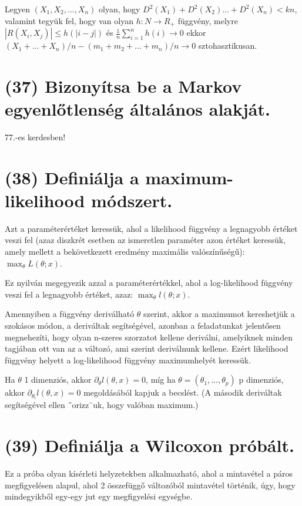 \documentclass[12p]{article}
\begin{document}
Legyen $(X_1, X_2, ..., X_n)$ olyan, hogy $D^2(X_1) + D^2(X_2) ... + D^2(X_n) < kn$, valamint tegyük fel, hogy van olyan $h: N \rightarrow R_{+}$ függvény, melyre $|R(X_i, X_j)| \leq h(|i-j|)$ és $\frac{1}{n} \displaystyle{\sum^n_{i=1}} h(i) \rightarrow 0$ ekkor $(X_1 + ... + X_n) / n - (m_1 + m_2 + ... + m_n)/n \rightarrow 0$ sztohasztikusan.

\section{(37) Bizonyítsa be a Markov egyenlőtlenség általános alakját.}

77.-es kerdesben!

\section{(38) Definiálja a maximum-likelihood módszert.}

Azt a paraméterértéket keressük, ahol a likelihood függvény a legnagyobb értéket veszi fel (azaz diszkrét esetben az
ismeretlen paraméter azon értéket keressük, amely mellett a bekövetkezett eredmény maximális valószínűségű): $\max_{\theta}L(\theta; x)$.

Ez nyilván megegyezik azzal a paraméterértékkel, ahol a log-likelihood függvény veszi fel a legnagyobb
értéket, azaz: $\max_{\theta} l(\theta; x)$.

Amennyiben a függvény deriválható $\theta$ szerint, akkor a maximumot kereshetjük a szokásos módon, a deriváltak
segítségével, azonban a feladatunkat jelentősen megnehezíti, hogy olyan n-szeres szorzatot kellene deriválni, amelyiknek minden tagjában ott van az a változó, ami szerint deriválnunk kellene. Ezért likelihood függvény helyett a log-likelihood függvény maximumhelyét keressük.

Ha $\theta$ 1 dimenziós, akkor $\partial_\theta l(\theta, x) = 0$, míg ha $\theta = (\theta_1, ..., \theta_p)$ p dimenziós, akkor $\partial_{\theta_i} l(\theta, x) = 0$ megoldásából
kapjuk a becslést. (A második deriváltak segítségével ellen ˝orizz¨uk, hogy valóban maximum.)


\section{(39) Definiálja a Wilcoxon próbált.}

Ez a próba olyan kísérleti helyzetekben alkalmazható, ahol a mintavétel a páros megfigyelésen alapul, ahol 2 összefüggő változóból mintavétel történik, úgy, hogy mindegyikből egy-egy jut egy megfigyelési egységbe.
\end{document}
